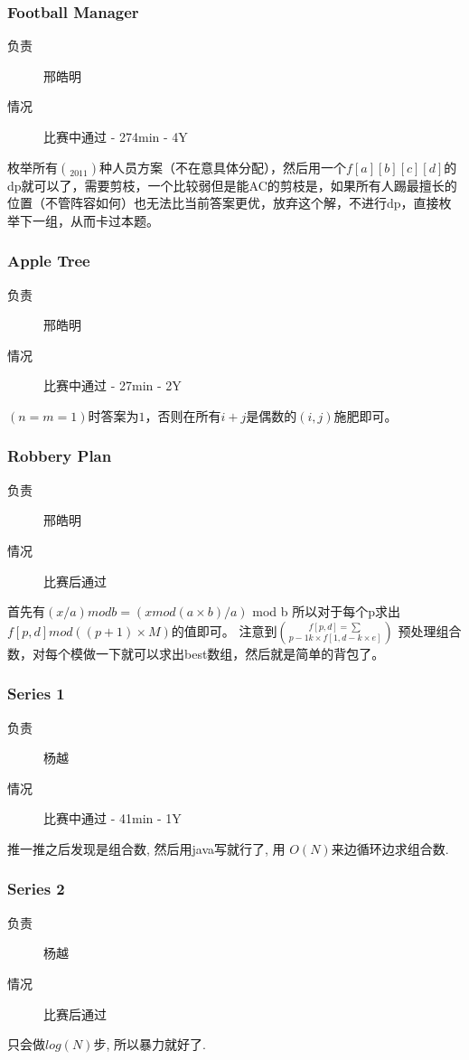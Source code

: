 \documentclass[a4paper, 11pt, nofonts, nocap, fancyhdr]{ctexart}
\newcommand{\problem}[1]{\subsubsection{#1}}
\begin{document}
\problem{Football Manager}

\begin{description}
\item[负责] 邢皓明
\item[情况] 比赛中通过 - 274min - 4Y
\end{description}

枚举所有$\choose{20}{11}$种人员方案（不在意具体分配），然后用一个$f[a][b][c][d]$的dp就可以了，需要剪枝，一个比较弱但是能AC的剪枝是，如果所有人踢最擅长的位置（不管阵容如何）也无法比当前答案更优，放弃这个解，不进行dp，直接枚举下一组，从而卡过本题。

\problem{Apple Tree}

\begin{description}
\item[负责] 邢皓明
\item[情况] 比赛中通过 - 27min - 2Y
\end{description}

$(n=m=1)$时答案为$1$，否则在所有$i+j$是偶数的$(i,j)$施肥即可。

\problem{Robbery Plan}

\begin{description}
\item[负责] 邢皓明
\item[情况] 比赛后通过
\end{description}

首先有$(x / a) mod b = (x mod (a \times b) / a)$ mod b
所以对于每个p求出$f[p,d] mod ((p + 1) \times M)$的值即可。
注意到$f[p,d] = \sum \choose{p - 1}{k} \times f[1, d - k \times e]$
预处理组合数，对每个模做一下就可以求出best数组，然后就是简单的背包了。

\problem{Series 1}

\begin{description}
\item[负责] 杨越
\item[情况] 比赛中通过 - 41min - 1Y
\end{description}

推一推之后发现是组合数, 然后用java写就行了, 用 $O(N)$来边循环边求组合数.

\problem{Series 2}

\begin{description}
\item[负责] 杨越
\item[情况] 比赛后通过
\end{description}

只会做$log(N)$步, 所以暴力就好了.
\end{document}
